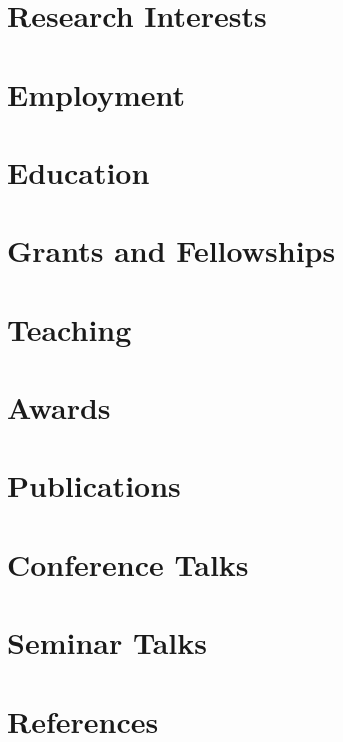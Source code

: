 \documentclass[11pt]{article}
\begin{document}


\section*{Research Interests}


\section*{Employment}


\section*{Education}


\section*{Grants and Fellowships}


\section*{Teaching}


\section*{Awards}


\newpage

\section*{Publications}


\section*{Conference Talks}


\section*{Seminar Talks}


\section*{References}

\end{document}
